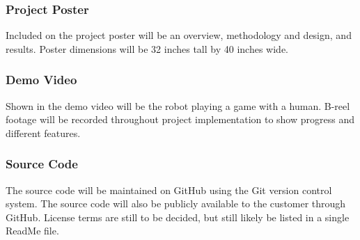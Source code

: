 \subsubsection{Project Poster}
Included on the project poster will be an overview, methodology and design, and results. Poster dimensions will be 32 inches tall by 40 inches wide.




\subsubsection{Demo Video}
Shown in the demo video will be the robot playing a game with a human. B-reel footage will be recorded throughout project implementation to show progress and different features.


\subsubsection{Source Code}
The source code will be maintained on GitHub using the Git version control system. The source code will also be publicly available to the customer through GitHub. License terms are still to be decided, but still likely be listed in a single ReadMe file.


